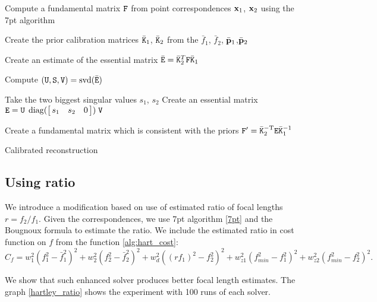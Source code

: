 \begin{algorithm}
\SetAlgoLined 
\LinesNotNumbered
 \Begin
    {Compute a fundamental matrix $\M{F}$ from point correspondences $\V{x}_1$, $\V{x}_2$ using the 7pt algorithm\;
    
    Create the prior calibration matrices $\bar{\M{K}}_1$, $\bar{\M{K}}_2$ from the $\bar{f}_1$, $\bar{f}_2$, $\bar{\V{p}}_1$,$\bar{\V{p}}_2$\; 
    
    Create an estimate of the essential matrix $\bar{\M{E}} = \bar{\M{K}}_2^T \M{F} \bar{\M{K}}_1$\;
    
    Compute $(\M{U}, \M{S}, \M{V}) = \text{svd} (\bar{\M{E}})$\;
    
    Take the two biggest singular values $s_1$, $s_2$
    Create an essential matrix $\M{E} = \M{U} \; \diag(\mat{ccc}{s_1 & s_2 & 0}) \; \M{V}$\;
    
    Create  a fundamental matrix which is consistent with the priors $\M{F}' =  \bar{\M{K}}_2^{-\T} \M{E} \bar{\M{K}}_1^{-1}$\;

    }
 \caption{Calibrated reconstruction~\cite{HartleyPriors}}
 \label{alg:calrec}
\end{algorithm}


\subsection{Using ratio}

We introduce a modification based on use of estimated ratio of focal lengths $r= f_2\slash f_1$.  Given the correspondences, we use 7pt algorithm \ref{7pt} and the Bougnoux formula to estimate the ratio. We include the estimated ratio in cost function on $f$ from the function \ref{alg:hart_cost}: \[ C_f = w_1^2(f_1^2-\bar{f}_1^2)^2 + w_2^2(f_2^2-\bar{f}_2^2)^2  + w_d^2((r f_1)^2-f_2^2)^2 + w_{z1}^2(f_{min}^2 - f_1^2)^2 + w_{z2}^2(f_{min}^2-f_2^2)^2. \]

We show that such enhanced solver produces better focal length estimates. The graph \ref{hartley_ratio} shows the experiment with 100 runs of each solver.

